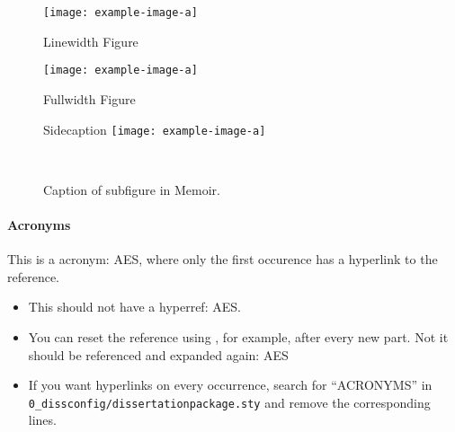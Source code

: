 \begin{figure}
	\texttt{[image: example-image-a]}
	\caption{Linewidth Figure}
	\label{LABEL1}
\end{figure}


\begin{figure}
	\begin{fullwidth}
	\texttt{[image: example-image-a]}
	\caption{Fullwidth Figure}
	\label{LABEL2}
	\end{fullwidth}
\end{figure}


\begin{figure}
	\begin{sidecaption}{Sidecaption}
		\texttt{[image: example-image-a]}
		\label{LABEL3}
	\end{sidecaption}
\end{figure}

\begin{figure}
	\\%
    \caption{Caption of subfigure in Memoir.}
    \label{LABEL6}
\end{figure}


\FloatBarrier
\paragraph{Acronyms}

This is a acronym: \gls{AES}, where only the first occurence has a hyperlink to the reference. 
\begin{itemize}
	\item This should not have a hyperref: \gls{AES}. 
	\item You can reset the reference using \detokenize{\glsresetall}, for example, after every new part. 
\glsresetall{} 
Not it should be referenced and expanded again: \gls{AES} 
	\item If you want hyperlinks on every occurrence, search for ``ACRONYMS'' in \lstinline{0_dissconfig/dissertationpackage.sty} and remove the corresponding lines. 
\end{itemize}







